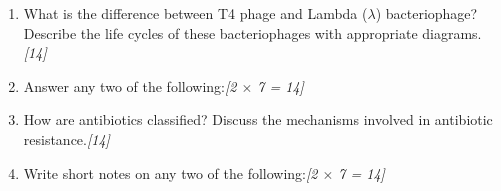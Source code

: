 \documentclass[11pt,a4paper]{article}
\newcommand{\pts}[1]{\hfill   \textit{[#1]}}
\begin{document}
\begin{enumerate}[label=   \textbf{\arabic*.}]
    \item What is the difference between T4 phage and Lambda ($\lambda$) bacteriophage? Describe the life cycles of these bacteriophages with appropriate diagrams.\pts{14}

    \bigskip

    \item Answer any two of the following:\pts{2 $ \times$ 7 = 14}
    

    \bigskip

    \item How are antibiotics classified? Discuss the mechanisms involved in antibiotic resistance.\pts{14}

    \bigskip

    \item Write short notes on any two of the following:\pts{2 $ \times$ 7 = 14}
    

\end{enumerate}
\end{document}
